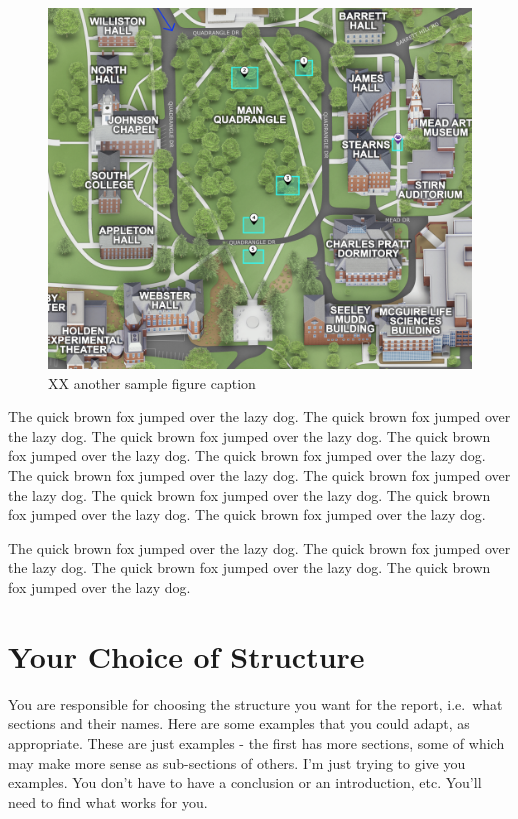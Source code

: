 \documentclass[12pt]{article}
\begin{document}
\begin{figure}
\includegraphics[width=0.8\linewidth]{gfx/campus_map} \caption{XX another sample figure caption}\label{fig:sample-fig2}
\end{figure}

The quick brown fox jumped over the lazy dog. The quick brown fox jumped
over the lazy dog. The quick brown fox jumped over the lazy dog. The
quick brown fox jumped over the lazy dog. The quick brown fox jumped
over the lazy dog. The quick brown fox jumped over the lazy dog. The
quick brown fox jumped over the lazy dog. The quick brown fox jumped
over the lazy dog. The quick brown fox jumped over the lazy dog. The
quick brown fox jumped over the lazy dog.

The quick brown fox jumped over the lazy dog. The quick brown fox jumped
over the lazy dog. The quick brown fox jumped over the lazy dog. The
quick brown fox jumped over the lazy dog.

\hypertarget{your-choice-of-structure}{%
\section{Your Choice of Structure}\label{your-choice-of-structure}}

You are responsible for choosing the structure you want for the report,
i.e.~what sections and their names. Here are some examples that you
could adapt, as appropriate. These are just examples - the first has
more sections, some of which may make more sense as sub-sections of
others. I'm just trying to give you examples. You don't have to have a
conclusion or an introduction, etc. You'll need to find what works for
you.
\end{document}
